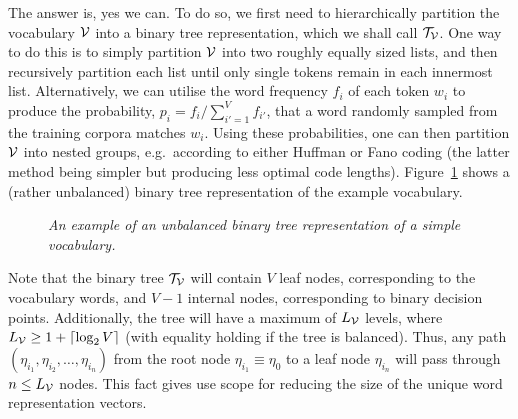 \documentclass[a4paper]{article}
\begin{document}
The answer is, yes we can. To do so, we first need to hierarchically partition the vocabulary ${\cal V}$ into 
a binary tree representation, which we shall call ${\cal T}_{\cal V}$. 
One way to do this is to simply partition ${\cal V}$ into two roughly equally sized lists, and then
recursively partition each list until only single tokens remain in each innermost list.
Alternatively, we can utilise the word frequency $f_i$ of each token $w_i$ to produce the probability,
$p_i=f_i/\sum_{i'=1}^V f_{i'}$, that a word randomly sampled from the training corpora matches $w_i$.
Using these probabilities, one can then partition ${\cal V}$ into nested groups, e.g.\ according to
either Huffman or Fano coding (the latter method being simpler but producing less optimal code lengths).
Figure~\ref{fig:catdog} shows a (rather unbalanced) binary tree representation of the example vocabulary. 
\begin{figure}[hbt]
\centering
{}
\caption{\em An example of an unbalanced binary tree representation of a simple vocabulary.}
\label{fig:catdog}
\end{figure}

Note that the binary tree ${\cal T}_{\cal V}$ will contain $V$ leaf nodes, corresponding to the vocabulary words, and
$V-1$ internal nodes, corresponding to binary decision points. 
Additionally, the tree will have a maximum of $L_{\cal V}$ levels, where
$L_{\cal V}\ge 1+\lceil\log_2 V\rceil$ (with equality holding if the tree is balanced).
Thus, any path $(\eta_{i_1},\eta_{i_2},\ldots,\eta_{i_n})$ 
from the root node $\eta_{i_1}\equiv\eta_{0}$ to a leaf node $\eta_{i_n}$ will pass through $n \le L_{\cal V}$ nodes.
This fact gives use scope for reducing the size of the unique word representation vectors.
\end{document}
